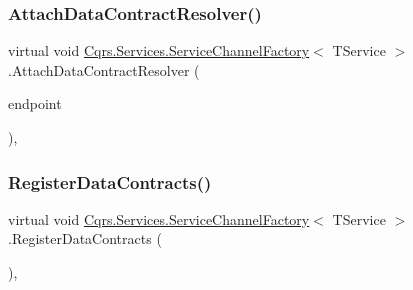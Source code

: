 \subsubsection{\texorpdfstring{Attach\+Data\+Contract\+Resolver()}{AttachDataContractResolver()}}
{\footnotesize\ttfamily virtual void \hyperlink{classCqrs_1_1Services_1_1ServiceChannelFactory}{Cqrs.\+Services.\+Service\+Channel\+Factory}$<$ T\+Service $>$.Attach\+Data\+Contract\+Resolver (\begin{DoxyParamCaption}\item[{Service\+Endpoint}]{endpoint }\end{DoxyParamCaption})\hspace{0.3cm}{\ttfamily [protected]}, {\ttfamily [virtual]}}

\mbox{\label{classCqrs_1_1Services_1_1ServiceChannelFactory_a0ef5c8298659383821b3b8901351db42_a0ef5c8298659383821b3b8901351db42}} 
\subsubsection{\texorpdfstring{Register\+Data\+Contracts()}{RegisterDataContracts()}}
{\footnotesize\ttfamily virtual void \hyperlink{classCqrs_1_1Services_1_1ServiceChannelFactory}{Cqrs.\+Services.\+Service\+Channel\+Factory}$<$ T\+Service $>$.Register\+Data\+Contracts (\begin{DoxyParamCaption}{ }\end{DoxyParamCaption})\hspace{0.3cm}{\ttfamily [protected]}, {\ttfamily [virtual]}}

